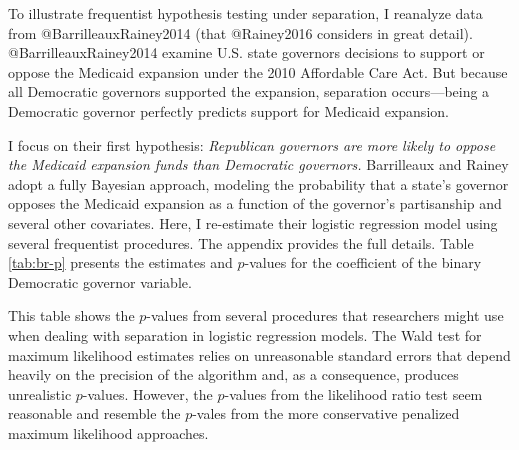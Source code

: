 \documentclass[
]{article}
\begin{document}
To illustrate frequentist hypothesis testing under separation, I
reanalyze data from @BarrilleauxRainey2014 (that @Rainey2016 considers
in great detail). @BarrilleauxRainey2014 examine U.S. state governors
decisions to support or oppose the Medicaid expansion under the 2010
Affordable Care Act. But because all Democratic governors supported the
expansion, separation occurs---being a Democratic governor perfectly
predicts support for Medicaid expansion.

I focus on their first hypothesis: \emph{Republican governors are more
likely to oppose the Medicaid expansion funds than Democratic
governors.} Barrilleaux and Rainey adopt a fully Bayesian approach,
modeling the probability that a state's governor opposes the Medicaid
expansion as a function of the governor's partisanship and several other
covariates. Here, I re-estimate their logistic regression model using
several frequentist procedures. The appendix provides the full details.
Table \ref{tab:br-p} presents the estimates and \(p\)-values for the
coefficient of the binary Democratic governor variable.

\renewcommand{\captiontext}{}
\renewcommand{\notetext}{This table shows the $p$-values from several procedures that researchers might use when dealing with separation in logistic regression models. The Wald test for maximum likelihood estimates relies on unreasonable standard errors that depend heavily on the precision of the algorithm and, as a consequence, produces unrealistic $p$-values. However, the $p$-values from the likelihood ratio test seem reasonable and resemble the $p$-vales from the more conservative penalized maximum likelihood approaches.}
\begin{table}[!h]
\caption{\label{tab:br-p}}
\centering
\fontsize{10}{12}\selectfont
\begin{threeparttable}

\begin{tablenotes}[para]
This table shows the $p$-values from several procedures that researchers might use when dealing with separation in logistic regression models. The Wald test for maximum likelihood estimates relies on unreasonable standard errors that depend heavily on the precision of the algorithm and, as a consequence, produces unrealistic $p$-values. However, the $p$-values from the likelihood ratio test seem reasonable and resemble the $p$-vales from the more conservative penalized maximum likelihood approaches.
\end{tablenotes}
\end{threeparttable}
\end{table}
\end{document}

